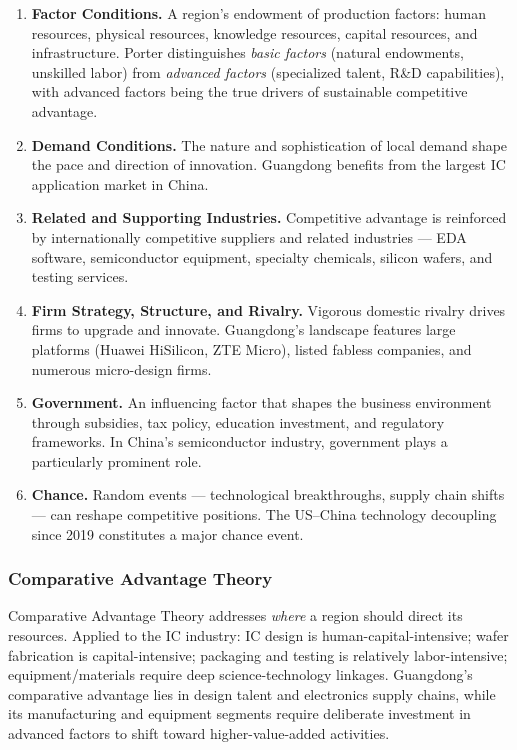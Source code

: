 \documentclass[12pt,a4paper]{article}
\begin{document}
\begin{enumerate}[label=(\arabic*)]
    \item \textbf{Factor Conditions.} A region's endowment of production
          factors: human resources, physical resources, knowledge resources,
          capital resources, and infrastructure. Porter distinguishes
          \textit{basic factors} (natural endowments, unskilled labor) from
          \textit{advanced factors} (specialized talent, R\&D capabilities),
          with advanced factors being the true drivers of sustainable
          competitive advantage.
    \item \textbf{Demand Conditions.} The nature and sophistication of
          local demand shape the pace and direction of innovation. Guangdong
          benefits from the largest IC application market in China.
    \item \textbf{Related and Supporting Industries.} Competitive advantage
          is reinforced by internationally competitive suppliers and related
          industries — EDA software, semiconductor equipment, specialty
          chemicals, silicon wafers, and testing services.
    \item \textbf{Firm Strategy, Structure, and Rivalry.} Vigorous domestic
          rivalry drives firms to upgrade and innovate. Guangdong's landscape
          features large platforms (Huawei HiSilicon, ZTE Micro), listed
          fabless companies, and numerous micro-design firms.
    \item \textbf{Government.} An influencing factor that shapes the business
          environment through subsidies, tax policy, education investment,
          and regulatory frameworks. In China's semiconductor industry,
          government plays a particularly prominent role.
    \item \textbf{Chance.} Random events — technological breakthroughs,
          supply chain shifts — can reshape competitive positions. The
          US--China technology decoupling since 2019 constitutes a major
          chance event.
\end{enumerate}

\subsubsection{Comparative Advantage Theory}

Comparative Advantage Theory addresses \textit{where} a region should
direct its resources. Applied to the IC industry: IC design is
human-capital-intensive; wafer fabrication is capital-intensive;
packaging and testing is relatively labor-intensive; equipment/materials
require deep science-technology linkages. Guangdong's comparative
advantage lies in design talent and electronics supply chains, while its
manufacturing and equipment segments require deliberate investment in
advanced factors to shift toward higher-value-added activities.
\end{document}
